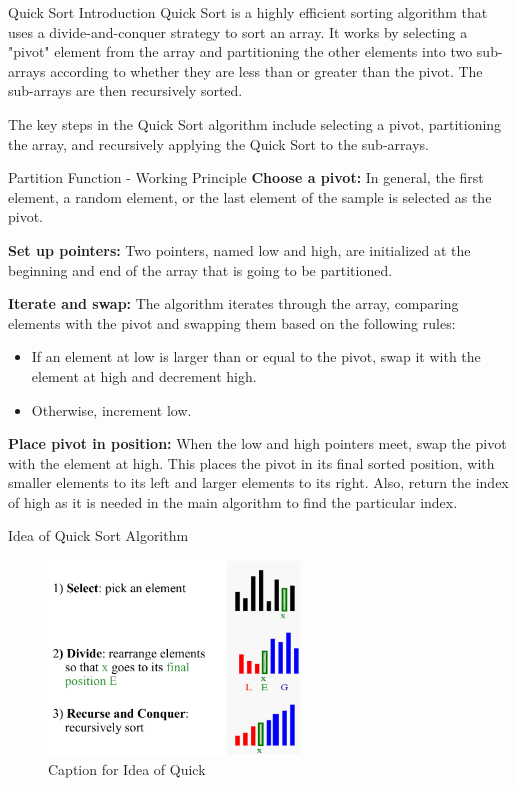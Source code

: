 \begin{frame}{Quick Sort Introduction}
    Quick Sort is a highly efficient sorting algorithm that uses a divide-and-conquer strategy to sort an array.\cite{5}
    It works by selecting a "pivot" element from the array and partitioning the other elements into two sub-arrays according to whether they are less than or greater than the pivot. The sub-arrays are then recursively sorted.
    
    The key steps in the Quick Sort algorithm include selecting a pivot, partitioning the array, and recursively applying the Quick Sort to the sub-arrays. 
\end{frame}

\begin{frame}{Partition Function - Working Principle}
    \textbf{Choose a pivot:} In general, the first element, a random element, or the last element of the sample is selected as the pivot.

    \textbf{Set up pointers:} Two pointers, named low and high, are initialized at the beginning and end of the array that is going to be partitioned.

    \textbf{Iterate and swap:} The algorithm iterates through the array, comparing elements with the pivot and swapping them based on the following rules:
    \begin{itemize}
        \item If an element at low is larger than or equal to the pivot, swap it with the element at high and decrement high.
        \item Otherwise, increment low.
    \end{itemize}

    \textbf{Place pivot in position:} When the low and high pointers meet, swap the pivot with the element at high. This places the pivot in its final sorted position, with smaller elements to its left and larger elements to its right. Also, return the index of high as it is needed in the main algorithm to find the particular index.
\end{frame}

\begin{frame}{Idea of Quick Sort Algorithm}
    \begin{figure}
        \includegraphics[width=0.6\textwidth]{assets/idea.png}
        \caption{Caption for Idea of Quick}
    \end{figure}
\end{frame}



